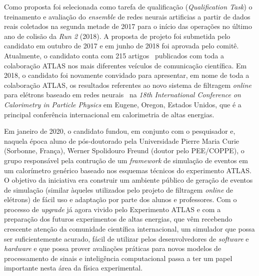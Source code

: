 Como proposta foi selecionada como tarefa de qualificação (\emph{Qualification Task}) o treinamento 
e avaliação do \emph{ensemble} de redes neurais artificias a partir de dados reais coletados na 
segunda metade de 2017 para o início das operações no último ano de colisão da \emph{Run 2} (2018). 
A proposta de projeto foi submetida pelo candidato em outubro de 2017 e em junho de 2018 
foi aprovada pelo comitê. Atualmente, o candidato conta com 215 artigos~\cite{my_inspirehep, my_orcid} publicados com toda 
a colaboração ATLAS nos mais diferentes veículos de comunicação científica. Em 2018, o candidato 
foi novamente convidado para apresentar, em nome de toda a colaboração ATLAS, os resultados 
referentes ao novo sistema de filtragem \emph{online} para elétrons baseado em redes neurais~\cite{calor2018}
na \emph{18th International Conference on Calorimetry in Particle Physics} em Eugene, Oregon, Estados 
Unidos, que é a principal conferência internacional em calorimetria de altas energias.



Em janeiro de 2020, o candidato fundou, em conjunto com o pesquisador e, naquela 
época aluno de pós-doutorado pela Universidade Pierre Maria Curie (Sorbonne, França), Werner 
Spolidouro Freund (doutor pelo PEE/COPPE), o grupo responsável pela contrução de um \emph{framework} 
de simulação de eventos em um 
calorímetro genérico baseado nos esquemas técnicos do experimento ATLAS.  O objetivo da iniciativa 
era construir um ambiente público de geração de eventos de simulação (similar àqueles utilizados 
pelo projeto de filtragem \emph{online} de elétrons) de fácil uso e adaptação por parte dos alunos e 
professores. Com o processo de \emph{upgrade} já agora vivido pelo Experimento ATLAS e com a preparação 
dos futuros experimentos de altas energias, que vêm recebendo crescente atenção da comunidade 
científica internacional, um simulador que possa ser suficientemente acurado, fácil de utilizar 
pelos desenvolvedores de \emph{software} e \emph{hardware} e que possa prover avaliações práticas para novos 
modelos de processamento de sinais e inteligência computacional passa a ter um papel importante 
nesta área da física experimental.


